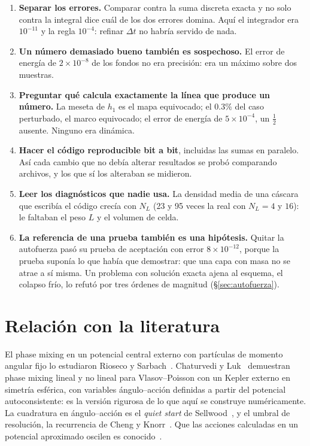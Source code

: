 \documentclass[11pt,a4paper]{article}
\begin{document}
\begin{enumerate}
  \item \textbf{Separar los errores.} Comparar contra la suma discreta exacta y no solo
    contra la integral dice cuál de los dos errores domina. Aquí el integrador era
    $10^{-11}$ y la regla $10^{-4}$: refinar $\Delta t$ no habría servido de nada.
  \item \textbf{Un número demasiado bueno también es sospechoso.} El error de energía de
    $2\times10^{-8}$ de los fondos no era precisión: era un máximo sobre dos muestras.
  \item \textbf{Preguntar qué calcula exactamente la línea que produce un número.} La
    meseta de $h_1$ es el mapa equivocado; el $0.3\%$ del caso perturbado, el marco
    equivocado; el error de energía de $5\times10^{-4}$, un $\tfrac12$ ausente. Ninguno era
    dinámica.
  \item \textbf{Hacer el código reproducible bit a bit}, incluidas las sumas en paralelo.
    Así cada cambio que no debía alterar resultados se probó comparando archivos, y los que
    sí los alteraban se midieron.
  \item \textbf{Leer los diagnósticos que nadie usa.} La densidad media de una cáscara
    que escribía el código crecía con $N_L$ (23 y 95 veces la real con $N_L=4$ y $16$): le
    faltaban el peso $L$ y el volumen de celda.
  \item \textbf{La referencia de una prueba también es una hipótesis.} Quitar la
    autofuerza pasó su prueba de aceptación con error $8\times10^{-12}$, porque la prueba
    suponía lo que había que demostrar: que una capa con masa no se atrae a sí misma. Un
    problema con solución exacta ajena al esquema, el colapso frío, lo refutó por tres
    órdenes de magnitud (\S\ref{sec:autofuerza}).
\end{enumerate}

\section{Relación con la literatura}
\label{sec:literatura}

El phase mixing en un potencial central externo con partículas de momento angular fijo lo
estudiaron Rioseco y Sarbach~\cite{rioseco2020}. Chaturvedi y Luk~\cite{chaturvedi2024}
demuestran phase mixing lineal y no lineal para Vlasov--Poisson con un Kepler externo en
simetría esférica, con variables ángulo--acción definidas a partir del potencial
autoconsistente: es la versión rigurosa de lo que aquí se construye numéricamente. La
cuadratura en ángulo--acción es el \emph{quiet start} de Sellwood~\cite{sellwood1997}, y
el umbral de resolución, la recurrencia de Cheng y Knorr~\cite{chengknorr1976}. Que las
acciones calculadas en un potencial aproximado oscilen es conocido~\cite{sanders2016,burger2021}.
\end{document}
